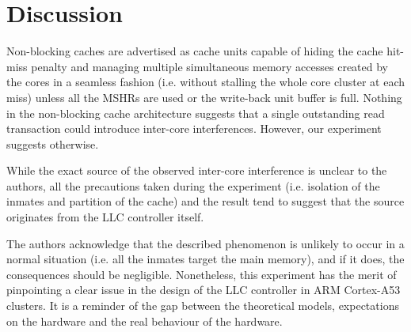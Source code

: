 \section{Discussion}
    Non-blocking caches are advertised as cache units capable of hiding the cache hit-miss penalty and managing multiple simultaneous memory accesses created by the cores in a seamless fashion (i.e. without stalling the whole core cluster at each miss) unless all the MSHRs are used or the write-back unit buffer is full.
    Nothing in the non-blocking cache architecture suggests that a single outstanding read transaction could introduce inter-core interferences. However, our experiment suggests otherwise.

    While the exact source of the observed inter-core interference is unclear to the authors, all the precautions taken during the experiment (i.e. isolation of the inmates and partition of the cache) and the result tend to suggest that the source originates from the LLC controller itself.

    The authors acknowledge that the described phenomenon is unlikely to occur in a normal situation (i.e. all the inmates target the main memory), and if it does, the consequences should be negligible.
    Nonetheless, this experiment has the merit of pinpointing a clear issue in the design of the LLC controller in ARM Cortex-A53 clusters.
    It is a reminder of the gap between the theoretical models, expectations on the hardware and the real behaviour of the hardware.

